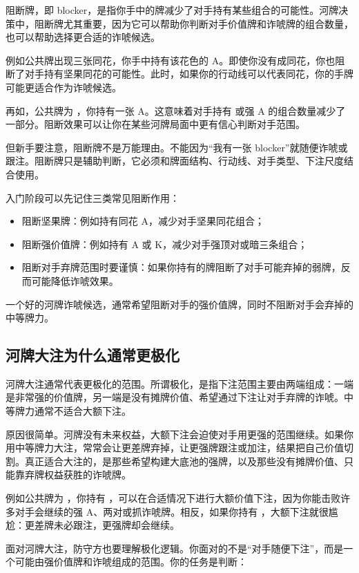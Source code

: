阻断牌，即 blocker，是指你手中的牌减少了对手持有某些组合的可能性。河牌决策中，阻断牌尤其重要，因为它可以帮助你判断对手价值牌和诈唬牌的组合数量，也可以帮助选择更合适的诈唬候选。

例如公共牌出现三张同花，你手中持有该花色的 A。即使你没有成同花，你也阻断了对手持有坚果同花的可能性。此时，如果你的行动线可以代表同花，你的手牌可能更适合作为诈唬候选。

再如，公共牌为 ，你持有一张 A。这意味着对手持有  或强 A 的组合数量减少了一部分。阻断效果可以让你在某些河牌局面中更有信心判断对手范围。

但新手要注意，阻断牌不是万能理由。不能因为“我有一张 blocker”就随便诈唬或跟注。阻断牌只是辅助判断，它必须和牌面结构、行动线、对手类型、下注尺度结合使用。

入门阶段可以先记住三类常见阻断作用：

\begin{itemize}
\item 阻断坚果牌：例如持有同花 A，减少对手坚果同花组合；
\item 阻断强价值牌：例如持有 A 或 K，减少对手强顶对或暗三条组合；
\item 阻断对手弃牌范围时要谨慎：如果你持有的牌阻断了对手可能弃掉的弱牌，反而可能降低诈唬效果。
\end{itemize}

一个好的河牌诈唬候选，通常希望阻断对手的强价值牌，同时不阻断对手会弃掉的中等牌力。

\subsection{河牌大注为什么通常更极化}

河牌大注通常代表更极化的范围。所谓极化，是指下注范围主要由两端组成：一端是非常强的价值牌，另一端是没有摊牌价值、希望通过下注让对手弃牌的诈唬。中等牌力通常不适合大额下注。

原因很简单。河牌没有未来权益，大额下注会迫使对手用更强的范围继续。如果你用中等牌力大注，常常会让更差牌弃掉，让更强牌跟注或加注，结果把自己价值切割。真正适合大注的，是那些希望构建大底池的强牌，以及那些没有摊牌价值、只能靠弃牌权益获胜的诈唬牌。

例如公共牌为 ，你持有 ，可以在合适情况下进行大额价值下注，因为你能击败许多对手会继续的强 A、两对或抓诈唬牌。相反，如果你持有 ，大额下注就很尴尬：更差牌未必跟注，更强牌却会继续。

面对河牌大注，防守方也要理解极化逻辑。你面对的不是“对手随便下注”，而是一个可能由强价值牌和诈唬组成的范围。你的任务是判断：

